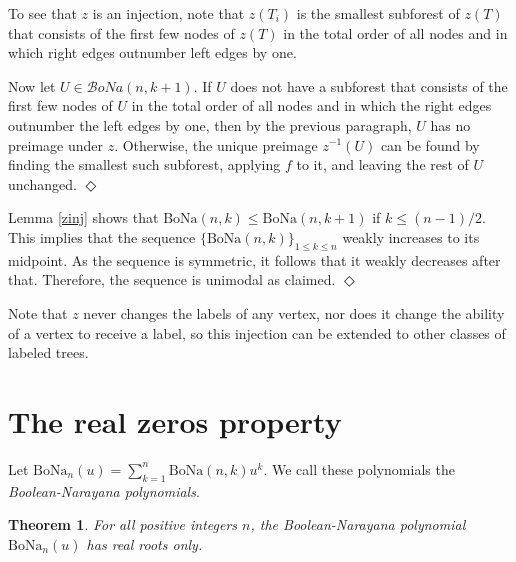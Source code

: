 \documentclass[11pt]{article}
\newcommand{\bona}{\mathrm{BoNa}}
\newcommand{\qed}{\mbox{$\Diamond$}\vspace{\baselineskip}}
\newtheorem{theorem}{Theorem}[section]
\newenvironment{proof}{\noindent {\bf Proof:}}{{\qed}}
\begin{document}
\begin{proof}
\begin{proof}
To see that $z$ is an injection, note that $z(T_i)$ is the smallest
subforest of $z(T)$ that consists of the first few nodes of $z(T)$ in
the total order of all nodes and in which right edges outnumber left
edges by one.

 Now let $U\in \mathcal BoNa(n,k+1)$. If $U$ does not have a subforest that consists
 of the first few nodes of $U$ in the total order of all nodes and in
 which the right edges outnumber the left edges by one, then by the
 previous paragraph, $U$ has no preimage under $z$. Otherwise, the
 unique preimage $z^{-1}(U)$ can be found by finding the smallest such
 subforest, applying $f$ to it, and leaving the rest of $U$ unchanged.
\end{proof}

Lemma \ref{zinj} shows that $\bona(n,k)\leq \bona(n,k+1)$ if $k\leq (n-1)/2$. This implies that the sequence $\{\bona(n,k)\}_{1\leq k\leq n}$ weakly increases to its midpoint. As the sequence
is symmetric, it follows that it weakly decreases after that. Therefore, the sequence is unimodal as claimed. 
\end{proof}

Note that $z$ never changes the labels of any vertex, nor does it change the ability of a vertex to receive a label, so this injection can be extended to other classes of labeled trees. 

\section{The real zeros property} \label{realzeros}
Let $\bona_n(u)=\sum_{k=1}^n \bona(n,k)u^k$. We call these polynomials the {\em Boolean-Narayana polynomials}.  
\begin{theorem} \label{realzerostheorem} For all  positive integers $n$, the Boolean-Narayana polynomial $\bona_n(u)$ has real roots only. 
\end{theorem} 
\end{document}
